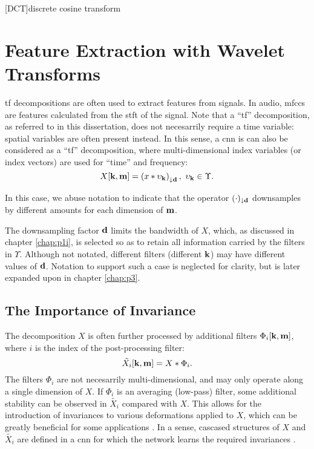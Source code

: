 [DCT]{discrete cosine transform}

\chapter{Feature Extraction with Wavelet Transforms}
\label{chap:p2i}

\ac{tf} decompositions are often used to extract features from signals. In audio, \acp{mfcc} are features calculated from the \ac{stft} of the signal. Note that a ``\ac{tf}'' decomposition, as referred to in this dissertation, does not necesarrily require a time variable: spatial variables are often present instead. In this sense, a \ac{cnn} is can also be considered as a ``\ac{tf}'' decomposition, where multi-dimensional index variables (or index vectors) are used for ``time'' and frequency:
\begin{equation}
    X[\vect{k}, \vect{m}] = \left( x * \upsilon_{\vect{k}} \right)_{\downarrow \vect{d}}, \ \upsilon_{\vect{k}} \in \Upsilon.
\end{equation}

In this case, we abuse notation to indicate that the operator $(\cdot)_{\downarrow \boldsymbol{\mathbf{d}}}$ downsamples by different amounts for each dimension of $\boldsymbol{\mathbf{m}}$. 

The downsampling factor $\boldsymbol{\mathbf{d}}$ limits the bandwidth of $X$, which, as discussed in chapter \ref{chap:p1i}, is selected so as to retain all information carried by the filters in $\Upsilon$. Although not notated, different filters (different $\boldsymbol{\mathbf{k}}$) may have different values of $\boldsymbol{\mathbf{d}}$. Notation to support such a case is neglected for clarity, but is later expanded upon in chapter \ref{chap:p3}.

\section{The Importance of Invariance}

The decomposition $X$ is often further processed by additional filters $\Phi_i[\boldsymbol{\mathbf{k}}, \boldsymbol{\mathbf{m}}]$, where $i$ is the index of the post-processing filter:
\begin{equation}
    \tilde{X_i}[\boldsymbol{\mathbf{k}}, \boldsymbol{\mathbf{m}}] = X * \Phi_i.
\end{equation}
The filters $\Phi_i$ are not necesarrily multi-dimensional, and may only operate along a single dimension of $X$. If $\Phi_i$ is an averaging (low-pass) filter, some additional stability can be observed in $\tilde{X_i}$ compared with $X$. This allows for the introduction of invariances to various deformations applied to $X$, which can be greatly beneficial for some applications \citep{cnninvariance}. In a sense, cascased structures of $X$ and $\tilde{X_i}$ are defined in a \ac{cnn} for which the network learns the required invariances \cite{2dscattering}.

